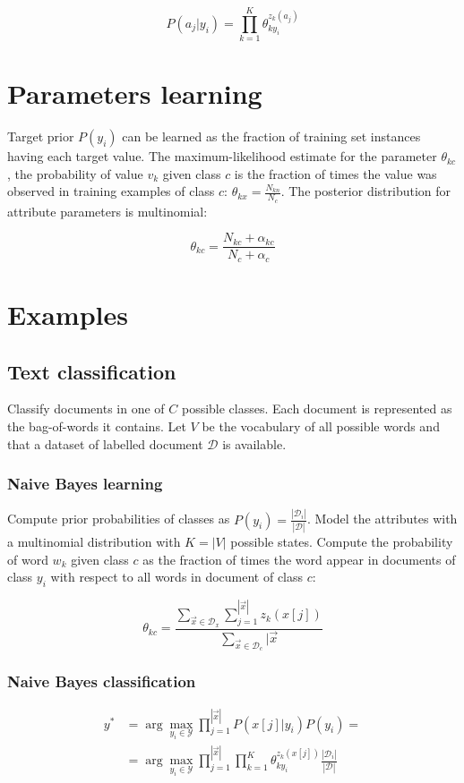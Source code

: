 	$$P(a_j|y_i) = \prod\limits_{k=1}^K\theta_{ky_i}^{z_k(a_j)}$$

\section{Parameters learning}
Target prior $P(y_i)$ can be learned as the fraction of training set instances having each target value.
The maximum-likelihood estimate for the parameter $\theta_{kc}$, the probability of value $v_k$ given class $c$ is the fraction of times the value was observed in training examples of class $c$: $\theta_{kx} = \frac{N_{kn}}{N_c}$.
The posterior distribution for attribute parameters is multinomial:

$$\theta_{kc} = \frac{N_{kc}+\alpha_{kc}}{N_c+\alpha_c}$$

\section{Examples}

	\subsection{Text classification}
	Classify documents in one of $C$ possible classes.
	Each document is represented as the bag-of-words it contains.
	Let $V$ be the vocabulary of all possible words and that a dataset of labelled document $\mathcal{D}$ is available.

		\subsubsection{Naive Bayes learning}
		Compute prior probabilities of classes as $P(y_i) = \frac{|\mathcal{D}_i|}{|\mathcal{D}|}$.
		Model the attributes with a multinomial distribution with $K=|V|$ possible states.
		Compute the probability of word $w_k$ given class $c$ as the fraction of times the word appear in documents of class $y_i$ with respect to all words in document of class $c$:

		$$\theta_{kc} = \frac{\sum\limits_{\vec{x}\in\mathcal{D}_x}\sum\limits_{j=1}^{|\vec{x}|}z_k(x[j])}{\sum\limits_{\vec{x}\in\mathcal{D}_c}|\vec{x}}$$

		\subsubsection{Naive Bayes classification}

		\begin{align*}
			y^* &=\arg\max\limits_{y_i\in\mathcal{Y}}\prod\limits_{j=1}^{|\vec{x}|}P(x[j]|y_i)P(y_i) =\\
					&=\arg\max\limits_{y_i\in\mathcal{Y}}\prod\limits_{j=1}^{|\vec{x}|}\prod\limits_{k=1}^K\theta_{ky_i}^{z_k(x[j])}\frac{|\mathcal{D}_i|}{|\mathcal{D}|}
		\end{align*}


